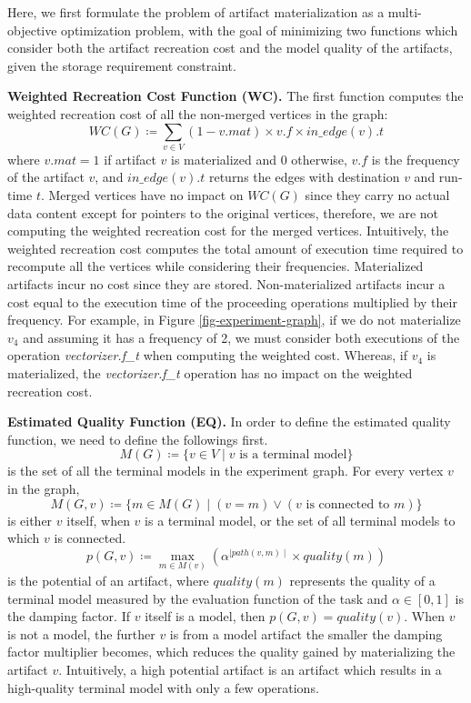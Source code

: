 Here, we first formulate the problem of artifact materialization as a multi-objective optimization problem, with the goal of minimizing two functions which consider both the artifact recreation cost and the model quality of the artifacts, given the storage requirement constraint.

\textbf{Weighted Recreation Cost Function (WC).} 
The first function computes the weighted recreation cost of all the non-merged vertices in the graph:
\[
WC(G) \coloneqq   \sum\limits_{v \in V}  (1-v.mat) \times v.f \times in\_edge(v).t
\]
where $v.mat = 1$ if artifact $v$ is materialized and $0$ otherwise, $v.f$ is the frequency of the artifact $v$, and $in\_edge(v).t$ returns the edges with destination $v$ and run-time $t$.
Merged vertices have no impact on $WC(G)$ since they carry no actual data content except for pointers to the original vertices, therefore, we are not computing the weighted recreation cost for the merged vertices.
Intuitively, the weighted recreation cost computes the total amount of execution time required to recompute all the vertices while considering their frequencies.
Materialized artifacts incur no cost since they are stored.
Non-materialized artifacts incur a cost equal to the execution time of the proceeding operations multiplied by their frequency.
For example, in Figure \ref{fig-experiment-graph}, if we do not materialize $v_4$ and assuming it has a frequency of 2, we must consider both executions of the operation \textit{vectorizer.f\_t}  when computing the weighted cost.
Whereas, if $v_4$ is materialized, the \textit{vectorizer.f\_t} operation has no impact on the weighted recreation cost.

\textbf{Estimated Quality Function (EQ).} 
In order to define the estimated quality function, we need to define the followings first.
\[
M(G) \coloneqq  \{v \in V \mid v \text{ is a terminal model}\}
\]
is the set of all the terminal models in the experiment graph.
For every vertex $v$ in the graph, 
\[
M(G, v) \coloneqq  \{m \in M(G) \mid (v = m) \vee (v \text{ is connected to } m)\}
\]
is either $v$ itself, when $v$ is a terminal model, or the set of all terminal models to which $v$ is connected.
\[
p(G, v) \coloneqq  \max\limits_{m \in M(v)} ( \alpha ^ {\mid path(v,m) \mid} \times quality(m) )
\]
is the potential of an artifact, where $quality(m)$ represents the quality of a terminal model measured by the evaluation function of the task and $\alpha \in [0,1]$ is the damping factor.
If $v$ itself is a model, then $p(G, v) = quality(v)$.
When $v$ is not a model, the further $v$ is from a model artifact the smaller the damping factor multiplier becomes, which reduces the quality gained by materializing the artifact $v$.
Intuitively, a high potential artifact is an artifact which results in a high-quality terminal model with only a few operations.

